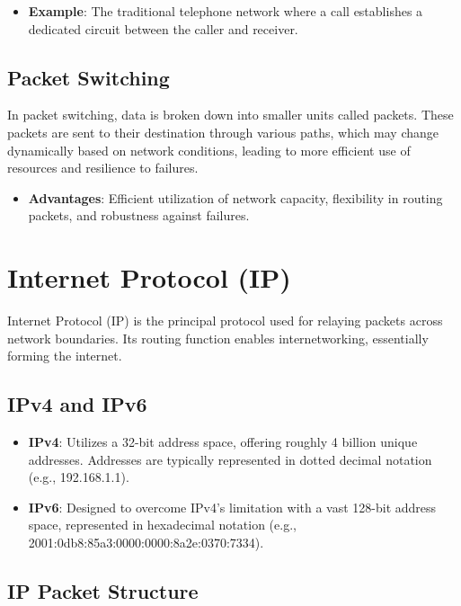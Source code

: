 \documentclass{article}
\begin{document}
\begin{itemize}
  \item \textbf{Example}: The traditional telephone network where a call establishes a dedicated circuit between the caller and receiver.
\end{itemize}

\subsection{Packet Switching}

In packet switching, data is broken down into smaller units called packets. These packets are sent to their destination through various paths, which may change dynamically based on network conditions, leading to more efficient use of resources and resilience to failures.

\begin{itemize}
  \item \textbf{Advantages}: Efficient utilization of network capacity, flexibility in routing packets, and robustness against failures.
\end{itemize}

\section{Internet Protocol (IP)}

Internet Protocol (IP) is the principal protocol used for relaying packets across network boundaries. Its routing function enables internetworking, essentially forming the internet.

\subsection{IPv4 and IPv6}

\begin{itemize}
  \item \textbf{IPv4}: Utilizes a 32-bit address space, offering roughly 4 billion unique addresses. Addresses are typically represented in dotted decimal notation (e.g., 192.168.1.1).
  \item \textbf{IPv6}: Designed to overcome IPv4's limitation with a vast 128-bit address space, represented in hexadecimal notation (e.g., 2001:0db8:85a3:0000:0000:8a2e:0370:7334).
\end{itemize}

\subsection{IP Packet Structure}
\end{document}
